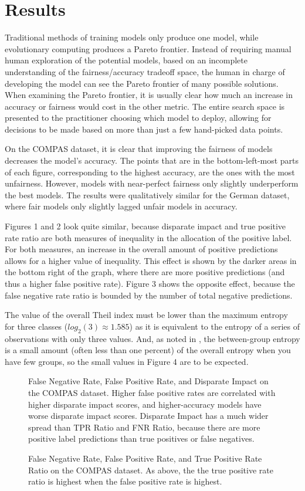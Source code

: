 \documentclass[twoside]{article}
\newcommand{\figures}[4]{
	\begin{figure}[H]{
		\centering{
			\texttt{[image: \#1]}
		}
		\caption{#2}
		}
	\end{figure}
	\begin{figure}[H] {
		\centering{
			\texttt{[image: \#3]}
		}
		\caption{#4}
	}
	\end{figure}
}
\begin{document}
\section{Results}	
Traditional methods of training models only produce one model, while evolutionary computing produces a Pareto frontier.  Instead of requiring manual human exploration of the potential models, based on an incomplete understanding of the fairness/accuracy tradeoff space, the human in charge of developing the model can see the Pareto frontier of many possible solutions. When examining the Pareto frontier, it is usually clear how much an increase in accuracy or fairness would cost in the other metric. The entire search space is presented to the practitioner choosing which model to deploy, allowing for decisions to be made based on more than just a few hand-picked data points.

On the COMPAS dataset, it is clear that improving the fairness of models decreases the model’s accuracy. The points that are in the bottom-left-most parts of each figure, corresponding to the highest accuracy, are the ones with the most unfairness. However, models with near-perfect fairness only slightly underperform the best models. The results were qualitatively similar for the German dataset, where fair models only slightly lagged unfair models in accuracy. 

Figures 1 and 2 look quite similar, because disparate impact and true positive rate ratio are both measures of inequality in the allocation of the positive label. For both measures, an increase in the overall amount of positive predictions allows for a higher value of inequality. This effect is shown by the darker areas in the bottom right of the graph, where there are more positive predictions (and thus a higher false positive rate). Figure 3 shows the opposite effect, because the false negative rate ratio is bounded by the number of total negative predictions.

The value of the overall Theil index must be lower than the maximum entropy for three classes ($log_2(3) \approx 1.585$) as it is equivalent to the entropy of a series of observations with only three values. And, as noted in \citep{Speicher:2018}, the between-group entropy is a small amount (often less than one percent) of the overall entropy when you have few groups, so the small values in Figure 4 are to be expected.


\figures{Disparate Impact|COMPAS.png}{False Negative Rate, False Positive Rate, and Disparate Impact on the COMPAS dataset. Higher false positive rates are correlated with higher disparate impact scores, and higher-accuracy models have worse disparate impact scores. Disparate Impact has a much wider spread than TPR Ratio and FNR Ratio, because there are more positive label predictions than true positives or false negatives.}{TPR Ratio|COMPAS.png}{False Negative Rate, False Positive Rate, and True Positive Rate Ratio on the COMPAS dataset. As above, the the true positive rate ratio is highest when the false positive rate is highest.}
\end{document}
